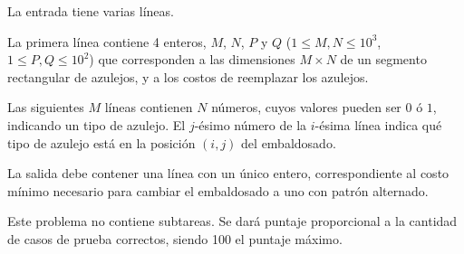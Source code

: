 \documentclass{oci}
\begin{document}
\begin{inputDescription}
La entrada tiene varias líneas.

La primera línea contiene 4 enteros, $M$, $N$, $P$ y $Q$ ($1 \le M, N \le 10^3$, $1 \le P, Q \le 10^2$) que corresponden a las dimensiones $M \times N$ de un segmento rectangular de azulejos, y a los costos de reemplazar los azulejos.

Las siguientes $M$ líneas contienen $N$ números, cuyos valores pueden ser $0$ ó
$1$, indicando un tipo de azulejo.
El $j$-ésimo número de la $i$-ésima línea indica qué tipo de azulejo está en la
posición $(i, j)$ del embaldosado.
\end{inputDescription}

\begin{outputDescription}
La salida debe contener una línea con un único entero, correspondiente al costo mínimo necesario
para cambiar el embaldosado a uno con patrón alternado.
\end{outputDescription}

\begin{scoreDescription}
  Este problema no contiene subtareas.
  Se dará puntaje proporcional a la cantidad de casos de prueba correctos, siendo
  100 el puntaje máximo.
\end{scoreDescription}

\begin{sampleDescription}
\end{sampleDescription}
\end{document}
